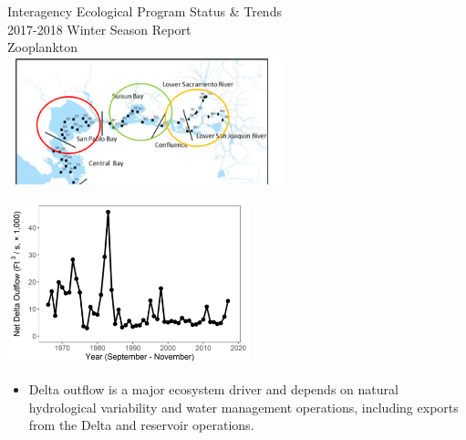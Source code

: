 \documentclass[]{article}\usepackage[]{graphicx}\usepackage[]{color}
\begin{document}
\newpage


\begin{Row}
  \begin{Cell}{7}
    \vspace{0.2cm}
    \begin{center}
      \doublespacing
      {\Large Interagency Ecological Program Status \& Trends } \\
      \vspace{0.2cm}
      {\Large 2017-2018 Winter Season Report} \\
      \vspace{0.5cm}
      {\Huge Zooplankton} \\
      \vspace{0.75cm}
      \includegraphics[width=8cm,align=m]{figures/region_map.png}
    \end{center}
  \end{Cell}
  \begin{Cell}{6}
    \vspace{0.2cm}
    \begin{center}
      \includegraphics[width=7cm,trim=0 0 0 0,clip,align=m]{figures/outflow_tmp.png}
      \begin{itemize}[leftmargin=*]
        \item Delta outflow is a major ecosystem driver and depends on natural 
        hydrological variability and water management operations, including exports 
        from the Delta and reservoir operations. 
      \end{itemize}
    \end{center}
  \end{Cell}
\end{Row}
\end{document}
